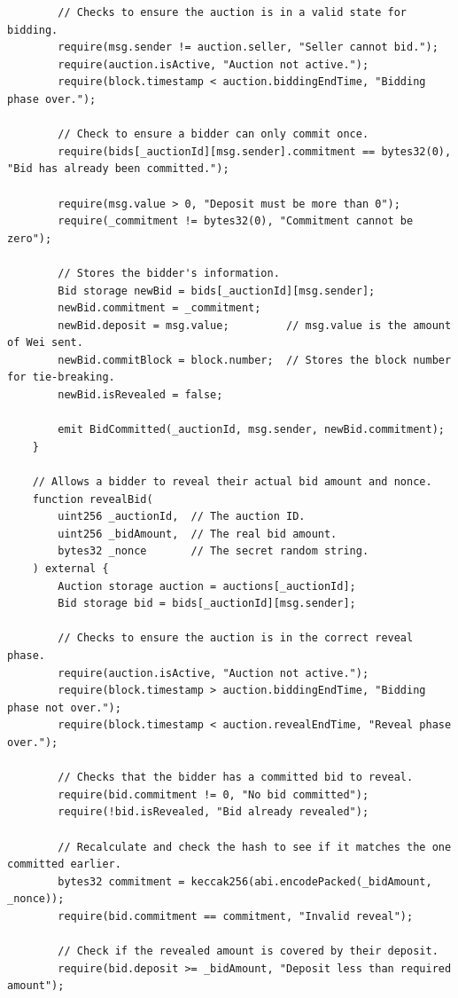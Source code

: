 \documentclass[11pt, a4paper]{article}
\begin{document}
\begin{lstlisting}
        // Checks to ensure the auction is in a valid state for bidding.
        require(msg.sender != auction.seller, "Seller cannot bid.");
        require(auction.isActive, "Auction not active.");
        require(block.timestamp < auction.biddingEndTime, "Bidding phase over.");

        // Check to ensure a bidder can only commit once.
        require(bids[_auctionId][msg.sender].commitment == bytes32(0), "Bid has already been committed.");

        require(msg.value > 0, "Deposit must be more than 0");
        require(_commitment != bytes32(0), "Commitment cannot be zero");

        // Stores the bidder's information.
        Bid storage newBid = bids[_auctionId][msg.sender];
        newBid.commitment = _commitment;
        newBid.deposit = msg.value;         // msg.value is the amount of Wei sent.
        newBid.commitBlock = block.number;  // Stores the block number for tie-breaking.
        newBid.isRevealed = false;

        emit BidCommitted(_auctionId, msg.sender, newBid.commitment);
    }

    // Allows a bidder to reveal their actual bid amount and nonce.
    function revealBid(
        uint256 _auctionId,  // The auction ID.
        uint256 _bidAmount,  // The real bid amount.
        bytes32 _nonce       // The secret random string.
    ) external {
        Auction storage auction = auctions[_auctionId];
        Bid storage bid = bids[_auctionId][msg.sender];

        // Checks to ensure the auction is in the correct reveal phase.
        require(auction.isActive, "Auction not active.");
        require(block.timestamp > auction.biddingEndTime, "Bidding phase not over.");
        require(block.timestamp < auction.revealEndTime, "Reveal phase over.");

        // Checks that the bidder has a committed bid to reveal.
        require(bid.commitment != 0, "No bid committed");
        require(!bid.isRevealed, "Bid already revealed");

        // Recalculate and check the hash to see if it matches the one committed earlier.
        bytes32 commitment = keccak256(abi.encodePacked(_bidAmount, _nonce));
        require(bid.commitment == commitment, "Invalid reveal");

        // Check if the revealed amount is covered by their deposit.
        require(bid.deposit >= _bidAmount, "Deposit less than required amount");


\end{lstlisting}
\end{document}
